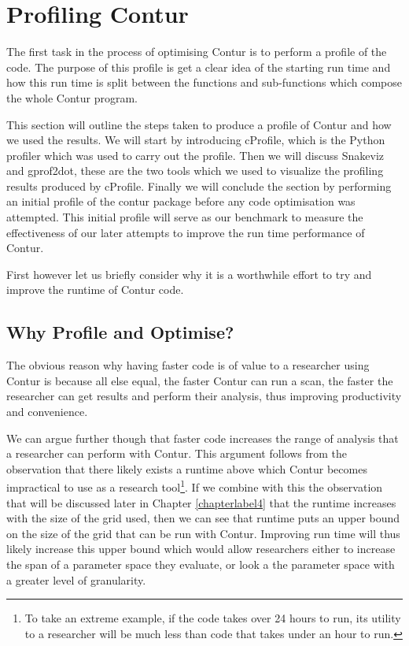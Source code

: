 \chapter{Profiling Contur}
\label{chapterlabel3}

The first task in the process of optimising Contur is to perform a profile of the code. The purpose of this profile is get a clear idea of the starting run time and how this run time is split between the functions and sub-functions which compose the whole Contur program.

This section will outline the steps taken to produce a profile of Contur and how we used the results. We will start by introducing cProfile, which is the Python profiler which was used to carry out the profile. Then we will discuss Snakeviz and gprof2dot, these are the two tools which we used to visualize the profiling results produced by cProfile. Finally we will conclude the section by performing an initial profile of the contur package before any code optimisation was attempted. This initial profile will serve as our benchmark to measure the effectiveness of our later attempts to improve the run time performance of Contur.

First however let us briefly consider why it is a worthwhile effort to try and improve the runtime of Contur code.

\section{Why Profile and Optimise?}
The obvious reason why having faster code is of value to a researcher using Contur is because all else equal, the faster Contur can run a scan, the faster the researcher can get results and perform their analysis, thus improving productivity and convenience. 

We can argue further though that faster code increases the range of analysis that a researcher can perform with Contur. This argument follows from the observation that there likely exists a runtime above which Contur becomes impractical to use as a research tool\footnote{To take an extreme example, if the code takes over 24 hours to run, its utility to a researcher will be much less than code that takes under an hour to run.}. If we combine with this the observation that will be discussed later in Chapter \ref{chapterlabel4} that the runtime increases with the size of the grid used, then we can see that runtime puts an upper bound on the size of the grid that can be run with Contur. Improving run time will thus likely increase this upper bound which would allow researchers either to increase the span of a parameter space they evaluate, or look a the parameter space with a greater level of granularity.

